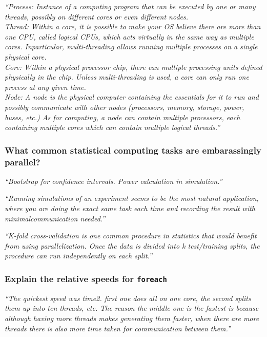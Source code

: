 \documentclass[12pt]{beamer}
\newcommand\ans[1]{{\it ``#1''}}
\newcommand\gap{\vspace{5mm}}
\begin{document}
\begin{frame}
  \ans{Process:   Instance  of  a  computing  program  that  can  be  executed  by  one  or  many threads, possibly on different cores or even different nodes.
    \\
    \gap
    Thread:  Within a core, it is possible to make your OS believe there are more than one CPU, called logical CPUs, which acts virtually in the same way as multiple cores.  Inparticular, multi-threading allows running multiple processes on a single physical core.
    \\
    \gap
    Core:  Within  a  physical  processor  chip,  there  can  multiple  processing  units  defined physically in the chip.  Unless multi-threading is used, a core can only run one process at any given time.
    \\
    \gap
    Node:  A node is the physical computer containing the essentials for it to run and possibly communicate with other nodes (processors, memory, storage, power, buses, etc.) As  for  computing,  a  node  can  contain  multiple  processors,  each  containing  multiple cores which can contain multiple logical threads.}

  \end{frame}

\begin{frame}   %

  \frametitle{What common statistical computing tasks are embarassingly parallel?}

  \ans{Bootstrap for confidence intervals.  Power calculation in simulation.}

  \gap
  
  \ans{Running simulations of an experiment seems to be the most natural application, where you are doing the exact same task each time and recording the result with minimalcommunication needed.}

  \gap
  
  \ans{K-fold cross-validation is one common procedure in statistics that would benefit from using parallelization.  Once the data is divided into k test/training splits, the procedure can run independently on each split.}
  
\end{frame}

\begin{frame} %

  \frametitle{ Explain the relative speeds for \texttt{foreach}}

    \ans{The quickest speed was time2.  first one does all on one core, the second splits them up into ten threads, etc.  The reason the middle one is the fastest is because although having more threads makes generating them faster, when there are more threads there is also more time taken for communication between them.}
    
  \end{frame}
\end{document}
